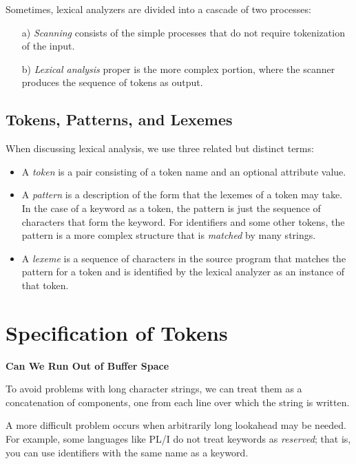 \documentclass[12pt,a4paper,twoside,openany]{book}
\begin{document}
Sometimes, lexical analyzers are divided into a cascade of two processes:
\begin{itemize}
    \item[a)]\textit{Scanning} consists of the simple processes that do not require tokenization of the input.
    \item[b)]\textit{Lexical analysis} proper is the more complex portion, where the scanner produces the sequence of tokens as output.
\end{itemize}

\subsection{Tokens, Patterns, and Lexemes}

When discussing lexical analysis, we use three related but distinct terms:
\begin{itemize}
    \item A \textit{token} is a pair consisting of a token name and an optional attribute value.
    \item A \textit{pattern} is a description of the form that the lexemes of a token may take. In the case of a keyword as a token, the pattern is just the sequence of characters that form the keyword. For identifiers and some other tokens, the pattern is a more complex structure that is \textit{matched} by many strings.
    \item A \textit{lexeme}  is a sequence of characters in the source program that matches the pattern for a token and is identified by the lexical analyzer as an instance of that token.
\end{itemize}

\section{Specification of Tokens}

\begin{framed}
    \begin{center}
        \textbf{{\large Can We Run Out of Buffer Space}}
    \end{center}

    To avoid problems with long character strings, we can treat them as a concatenation of components, one from each line over which the string is written.

    A more difficult problem occurs when arbitrarily long lookahead may be needed. For example, some languages like PL/I do not treat keywords as \textit{reserved}; that is, you can use identifiers with the same name as a keyword.
\end{framed}
\end{document}
